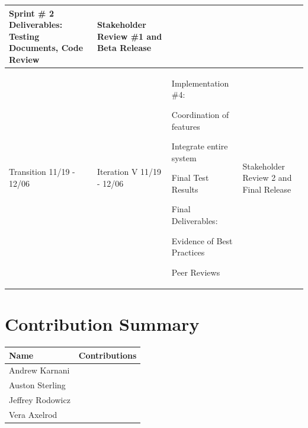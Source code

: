 \documentclass[11pt]{article}
\newenvironment{packed_itemize}{
\begin{itemize}
  \setlength{\itemsep}{1pt}
  \setlength{\parskip}{0pt}
  \setlength{\parsep}{0pt}
}{\end{itemize}}
\begin{document}
\begin{tabular}{|m{0.9in}|m{0.9in}|m{4in}|m{.8in}|}
Sprint \# 2 Deliverables:
 Testing Documents, Code Review &
Stakeholder Review \#1
and
Beta Release \\ \hline
Transition  11/19 - 12/06 &
Iteration V 11/19 - 12/06 & \vspace{0.1in}
Implementation \#4:
	\begin{packed_itemize}
		\vspace{-0.15in}
		\item Coordination of features
		\item Integrate entire system
	\end{packed_itemize}
Final Test Results

Final Deliverables:
	\begin{packed_itemize}
	\vspace{-0.15in}
		\item Evidence of Best Practices
		\item Peer Reviews
	\vspace{-0.15in}
	\end{packed_itemize}
&
Stakeholder Review 2 and Final Release \\
\hline
\end{tabular}


\section{Contribution Summary} %

\begin{tabular}{|m{1.4in}|m{4in}|}
\hline
\textbf{\large Name}     & \textbf{\large Contributions} \\
\hline\hline
 Andrew Karnani
	&
	 \begin{packed_itemize}
		\item
	\end{packed_itemize}
\\
\hline
 Auston Sterling
	&
	 \begin{packed_itemize}
	        \item
	\end{packed_itemize}
\\
\hline
Jeffrey Rodowicz
	&
	 \begin{packed_itemize}
		\item
	\end{packed_itemize}
\\
\hline
Vera Axelrod
	&
	 \begin{packed_itemize}
		\item
	\end{packed_itemize}
\\
\hline
\end{tabular}
\end{document}
